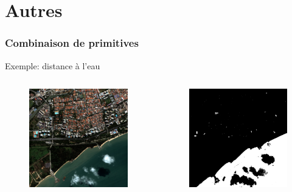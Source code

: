 \documentclass[compress,handout]{beamer}
\begin{document}
\section{Autres}


\begin{frame}
\frametitle{Combinaison de primitives}
Exemple: distance à l'eau
\begin{columns}
\begin{column}{0.32\textwidth}
\begin{figure}[]
  \includegraphics[width=1.0\textwidth]{radio2-extract-3b.jpg}
\end{figure}
\end{column}
\begin{column}{0.32\textwidth}
\begin{figure}[]
  \includegraphics[width=1.0\textwidth]{MNDWI2-threshold.jpg}

\end{figure}
\end{column}
\end{columns}
\end{frame}
\end{document}

